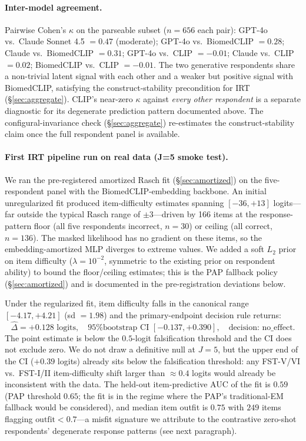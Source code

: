 \documentclass{article}
\begin{document}
\paragraph{Inter-model agreement.}
\label{sec:prelim_kappa}
Pairwise Cohen's $\kappa$ on the parseable subset ($n = 656$ each pair): GPT-4o vs.\ Claude Sonnet 4.5 $= 0.47$ (moderate); GPT-4o vs.\ BiomedCLIP $= 0.28$; Claude vs.\ BiomedCLIP $= 0.31$; GPT-4o vs.\ CLIP $= -0.01$; Claude vs.\ CLIP $= 0.02$; BiomedCLIP vs.\ CLIP $= -0.01$. The two generative respondents share a non-trivial latent signal with each other and a weaker but positive signal with BiomedCLIP, satisfying the construct-stability precondition for IRT (\S\ref{sec:aggregate}). CLIP's near-zero $\kappa$ against \emph{every other respondent} is a separate diagnostic for its degenerate prediction pattern documented above. The configural-invariance check (\S\ref{sec:aggregate}) re-estimates the construct-stability claim once the full respondent panel is available.

\paragraph{First IRT pipeline run on real data (J=5 smoke test).}
\label{sec:prelim_irt}
We ran the pre-registered amortized Rasch fit (\S\ref{sec:amortized}) on the five-respondent panel with the BiomedCLIP-embedding backbone. An initial unregularized fit produced item-difficulty estimates spanning $[-36, +13]$ logits---far outside the typical Rasch range of $\pm 3$---driven by 166 items at the response-pattern floor (all five respondents incorrect, $n = 30$) or ceiling (all correct, $n = 136$). The masked likelihood has no gradient on these items, so the embedding-amortized MLP diverges to extreme values. We added a soft $L_2$ prior on item difficulty ($\lambda = 10^{-2}$, symmetric to the existing prior on respondent ability) to bound the floor/ceiling estimates; this is the PAP fallback policy (\S\ref{sec:amortized}) and is documented in the pre-registration deviations below.

Under the regularized fit, item difficulty falls in the canonical range $[-4.17, +4.21]$ (sd $= 1.98$) and the primary-endpoint decision rule returns:
\begin{equation*}
    \hat\Delta = +0.128 \text{ logits}, \quad \text{95\% bootstrap CI } [-0.137, +0.390], \quad \text{decision: no\_effect}.
\end{equation*}
The point estimate is below the $0.5$-logit falsification threshold and the CI does not exclude zero. We do not draw a definitive null at $J = 5$, but the upper end of the CI ($+0.39$ logits) already sits below the falsification threshold: any FST-V/VI vs.\ FST-I/II item-difficulty shift larger than $\approx 0.4$ logits would already be inconsistent with the data. The held-out item-predictive AUC of the fit is $0.59$ (PAP threshold $0.65$; the fit is in the regime where the PAP's traditional-EM fallback would be considered), and median item outfit is $0.75$ with $249$ items flagging $\text{outfit} < 0.7$---a misfit signature we attribute to the contrastive zero-shot respondents' degenerate response patterns (see next paragraph).
\end{document}
